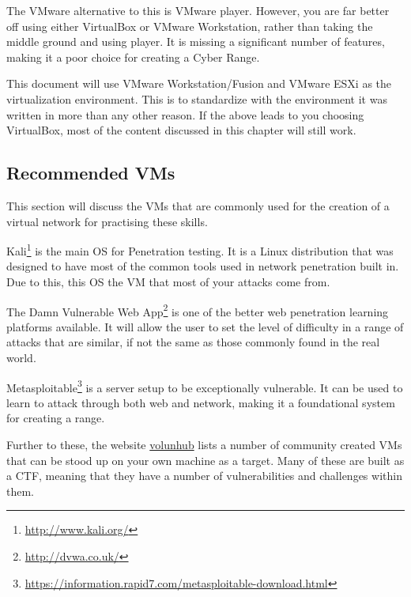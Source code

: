			The VMware alternative to this is VMware player. 
			However, you are far better off using either VirtualBox or VMware Workstation, rather than taking the middle ground and using player. 
			It is missing a significant number of features, making it a poor choice for creating a Cyber Range. 

			This document will use VMware Workstation/Fusion and VMware ESXi as the virtualization environment. 
			This is to standardize with the environment it was written in more than any other reason. 
			If the above leads to you choosing VirtualBox, most of the content discussed in this chapter will still work. 
		
		\subsection{Recommended VMs}
			This section will discuss the VMs that are commonly used for the creation of a virtual network for practising these skills. 
			\begin{description}
				\item[Kali Linux] Kali\footnote{\url{http://www.kali.org/}} is the main OS for Penetration testing. 
					It is a Linux distribution that was designed to have most of the common tools used in network penetration built in. 
					Due to this, this OS the VM that most of your attacks come from. 
				\item[DVWA] The Damn Vulnerable Web App\footnote{\url{http://dvwa.co.uk/}} is one of the better web penetration learning platforms available. 
					It will allow the user to set the level of difficulty in a range of attacks that are similar, if not the same as those commonly found in the real world. 
				\item[Metasploitable] Metasploitable\footnote{\url{https://information.rapid7.com/metasploitable-download.html}} is a server setup to be exceptionally vulnerable. 
					It can be used to learn to attack through both web and network, making it a foundational system for creating a range. 
			\end{description}

			Further to these, the website \href{vulnhub.com}{volunhub} lists a number of community created VMs that can be stood up on your own machine as a target. 
			Many of these are built as a CTF, meaning that they have a number of vulnerabilities and challenges within them. 

